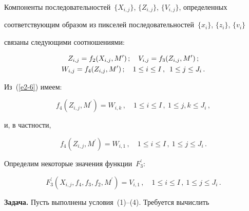 Компоненты последовательностей~$\{X_{i,j}\}$, $\{Z_{i,j}\}$, $\{V_{i,j}\}$, определенных


соответствующим образом из пикселей последовательностей~$\{x_i\}$, $\{z_i\}$, $\{v_i\}$


связаны следующими соотношениями:


\begin{gather*}


Z_{i,j}=f_2(X_{i,j}, M^\prime )\,;\quad  


V_{i,j}=f_3(Z_{i,j}, M^\prime )\,;\\ 


W_{i,j}=f_4(Z_{i,j}, M^\prime )\,;\quad 


1\leq i\leq I\,,\enskip 1\leq j\leq J_i\,.


\end{gather*}





Из~(\ref{e2-6}) имеем:


$$


f_4(Z_{i,j}, M^\prime )=W_{i,k}\,,\quad  1\leq i\leq I\,,\  1\leq j, k\leq J_i\,,


$$


и, в частности,


\begin{equation}


f_4(Z_{i,j}, M^\prime )=W_{i,1}\,,\quad  1\leq i\leq I\,,\  1\leq j\leq J_i\,.


\label{e3-6}


\end{equation}





Определим некоторые значения функции~$F^\prime_3$:


\begin{equation}


F^\prime_3(X_{i,j},f_4,f_3,f_2, M^\prime )=V_{i,1}\,,\quad  1\leq i\leq I\,,\  1\leq j\leq J_i\,.


\label{e4-6}


\end{equation}





\medskip





\noindent


\textbf{Задача.} Пусть выполнены условия~(1)--(4). Требуется вы\-чис\-лить


